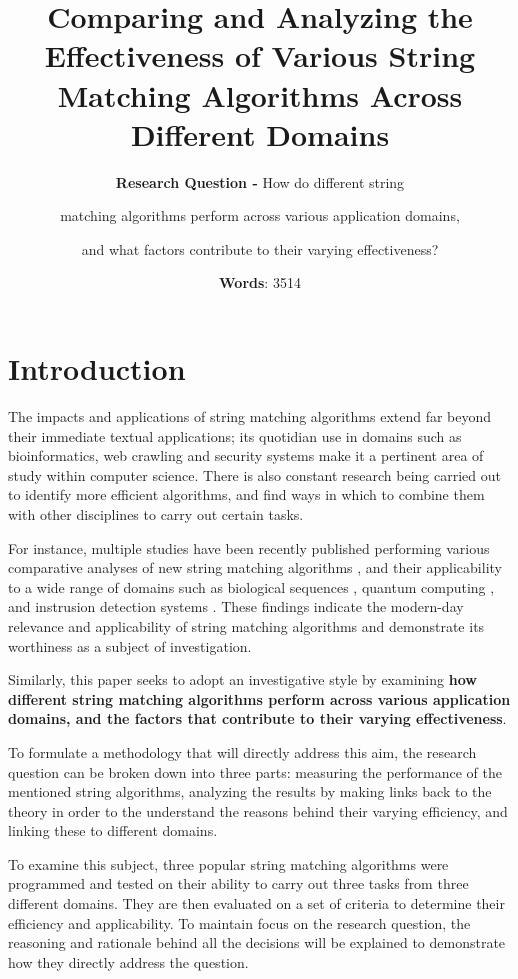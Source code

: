 \documentclass[12pt]{article}
\title{\textbf{Comparing and Analyzing the Effectiveness of Various String Matching Algorithms Across Different Domains}} %
\author{\textbf{Research Question -} How do different string \and matching algorithms perform across various application domains, \and and what factors contribute to their varying effectiveness?} %
\date{\textbf{Words}: 3514} %
\begin{document}
\doublespacing

\maketitle %
\thispagestyle{empty}
\pagebreak
\tableofcontents
\thispagestyle{empty}

\clearpage
{}

\pagebreak
\section{Introduction} %

The impacts and applications of string matching algorithms extend far beyond their immediate textual applications; its quotidian use in domains such as bioinformatics, web crawling and security systems make it a pertinent area of study within computer science. There is also constant research being carried out to identify more efficient algorithms, and find ways in which to combine them with other disciplines to carry out certain tasks.

For instance, multiple studies have been recently published performing various comparative analyses of new string matching algorithms \parencite{4}, and their applicability to a wide range of domains such as biological sequences \parencite{5}, quantum computing \parencite{6}, and instrusion detection systems \parencite{7}. These findings indicate the modern-day relevance and applicability of string matching algorithms and demonstrate its worthiness as a subject of investigation.

Similarly, this paper seeks to adopt an investigative style by examining \textbf{how different string matching algorithms perform across various application domains, and the factors that contribute to their varying effectiveness}. 

To formulate a methodology that will directly address this aim, the research question can be broken down into three parts: measuring the performance of the mentioned string algorithms, analyzing the results by making links back to the theory in order to the understand the reasons behind their varying efficiency, and linking these to different domains.

To examine this subject, three popular string matching algorithms were programmed and tested on their ability to carry out three tasks from three different domains. They are then evaluated on a set of criteria to determine their efficiency and applicability. To maintain focus on the research question, the reasoning and rationale behind all the decisions will be explained to demonstrate how they directly address the question.
\end{document}
